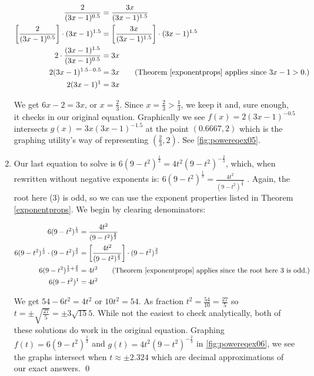 \begin{ex}
\begin{enumerate}
\begin{align*}
\dfrac{2}{(3x-1)^{0.5}} & = \dfrac{3x}{(3x-1)^{1.5}} \\
\left[ \dfrac{2}{(3x-1)^{0.5}} \right] \cdot (3x-1)^{1.5} & = \left[  \dfrac{3x}{(3x-1)^{1.5}} \right ] \cdot (3x-1)^{1.5} \\
2 \cdot \dfrac{(3x-1)^{1.5}}{(3x-1)^{0.5}} & = 3x \\
2 (3x-1)^{1.5-0.5} & = 3x \tag{Theorem \ref{exponentprops} applies since $3x-1 > 0$.} \\
2 (3x-1)^{1} & = 3x
\end{align*}

We get $6x-2 = 3x$, or $x = \frac{2}{3}$.  Since $x = \frac{2}{3} > \frac{1}{3}$, we keep it and, sure enough, it  checks in our original equation. Graphically we see $f(x)=2(3x-1)^{-0.5}$ intersects $g(x) = 3x (3x-1)^{-1.5}$ at the point $(0.6667, 2)$ which is the graphing utility's way of representing $\left(\frac{2}{3}, 2\right)$. See \autoref{fig:powereqex05}.

\item  Our last equation to solve is $6(9-t^2)^{\frac{1}{3}} = 4t^2 (9-t^2)^{-\frac{2}{3}}$, which, when rewritten without negative exponents is: $6(9-t^2)^{\frac{1}{3}} = \frac{4t^2}{(9-t^2)^{\frac{2}{3}}}$  .   Again, the root here ($3$) is odd, so we can use the exponent properties listed in Theorem \ref{exponentprops}.   We begin by clearing denominators: 

\begin{align*}
6(9-t^2)^{\frac{1}{3}} & = \frac{4t^2}{(9-t^2)^{\frac{2}{3}}} \\
6(9-t^2)^{\frac{1}{3}} \cdot (9-t^2)^{\frac{2}{3}} & = \left[   \frac{4t^2}{(9-t^2)^{\frac{2}{3}}}  \right ] \cdot (9-t^2)^{\frac{2}{3}} \\
6(9-t^2)^{\frac{1}{3} + \frac{2}{3}}& = 4t^2 \tag{Theorem \ref{exponentprops} applies since the root here $3$ is odd.} \\
6(9-t^2)^{1} & = 4t^2 \\
\end{align*}

We get $54 - 6t^2 = 4t^2$ or $10t^2 = 54$.  As fraction $t^2 = \frac{54}{10} = \frac{27}{5}$ so $t = \pm \sqrt{\frac{27}{5}} = \pm 3 \sqrt{15}{5}$.  While not the easiest to check analytically, both of these solutions do work in the original equation.  Graphing $f(t) = 6(9-t^2)^{\frac{1}{3}} $ and $g(t) =  4t^2 (9-t^2)^{-\frac{2}{3}}$ in \autoref{fig:powereqex06}, we see the graphs intersect when $t \approx \pm 2.324$ which are decimal approximations of our exact answers.
\qed


\end{enumerate}
\end{ex}
